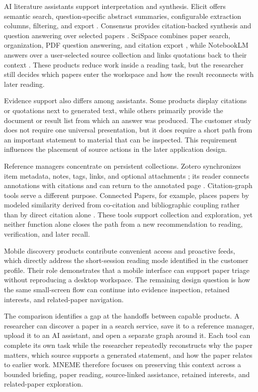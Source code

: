 AI literature assistants support interpretation and synthesis.  Elicit offers
semantic search, question-specific abstract summaries, configurable extraction
columns, filtering, and export \cite{elicitHelp2026}.  Consensus provides
citation-backed synthesis and question answering over selected papers
\cite{consensusHelp2026}.  SciSpace combines paper search, organization, PDF
question answering, and citation export \cite{scispaceHelp2026}, while
NotebookLM answers over a user-selected source collection and links quotations
back to their context \cite{notebookLMHelp2026}.  These products reduce work
inside a reading task, but the researcher still decides which papers enter the
workspace and how the result reconnects with later reading.

Evidence support also differs among assistants.  Some products display
citations or quotations next to generated text, while others primarily provide
the document or result list from which an answer was produced.  The customer
study does not require one universal presentation, but it does require a short
path from an important statement to material that can be inspected.  This
requirement influences the placement of source actions in the later application
design.

Reference managers concentrate on persistent collections.  Zotero synchronizes
item metadata, notes, tags, links, and optional attachments
\cite{zoteroSync2026}; its reader connects annotations with citations and can
return to the annotated page \cite{zoteroDocs2026}.  Citation-graph tools serve
a different purpose.  Connected Papers, for example, places papers by modeled
similarity derived from co-citation and bibliographic coupling rather than by
direct citation alone \cite{connectedPapersAbout2026}.  These tools support
collection and exploration, yet neither function alone closes the path from a
new recommendation to reading, verification, and later recall.

Mobile discovery products contribute convenient access and proactive feeds,
which directly address the short-session reading mode identified in the
customer profile.  Their role demonstrates that a mobile interface can support
paper triage without reproducing a desktop workspace.  The remaining design
question is how the same small-screen flow can continue into evidence
inspection, retained interests, and related-paper navigation.

The comparison identifies a gap at the handoffs between capable products.  A
researcher can discover a paper in a search service, save it to a reference
manager, upload it to an AI assistant, and open a separate graph around it.
Each tool can complete its own task while the researcher repeatedly
reconstructs why the paper matters, which source supports a generated
statement, and how the paper relates to earlier work.  MNEME therefore focuses
on preserving this context across a bounded briefing, paper reading,
source-linked assistance, retained interests, and related-paper exploration.


